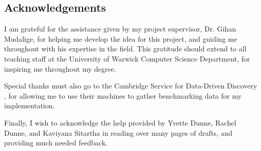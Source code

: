
\vspace*{\fill}
\begin{adjustwidth}{55pt}{55pt}
\section*{Acknowledgements}
I am grateful for the assistance given by my project supervisor, Dr. Gihan Mudalige, for helping me develop the idea for this project, and guiding me throughout with his expertise in the field. This gratitude should extend to all teaching staff at the University of Warwick Computer Science Department, for inspiring me throughout my degree.
\par Special thanks must also go to the Cambridge Service for Data-Driven Discovery , for allowing me to use their machines to gather benchmarking data for my implementation.
\par Finally, I wish to acknowledge the help provided by Yvette Dunne, Rachel Dunne, and Kaviyana Sitartha in reading over many pages of drafts, and providing much needed feedback.
\end{adjustwidth}
\vspace*{\fill}
